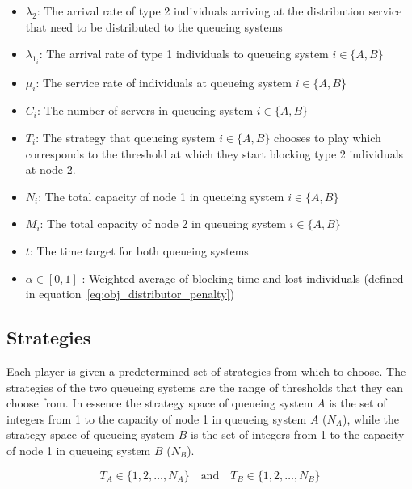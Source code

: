 \begin{itemize}
    \item \(\lambda_2\): The arrival rate of type 2 individuals arriving at the
    distribution service that need to be distributed to the queueing systems
    \item \(\lambda_{1_i}\): The arrival rate of type 1 individuals to queueing
    system \(i\in\{A, B\}\)
    \item \(\mu_i\): The service rate of individuals at queueing system
    \(i\in\{A, B\}\)
    \item \(C_i\): The number of servers in queueing system \(i\in\{A, B\}\)
    \item \(T_i\): The strategy that queueing system \(i\in\{A, B\} \) chooses
    to play which corresponds to the threshold at which they start blocking
    type 2 individuals at node 2.
    \item \(N_i\): The total capacity of node 1 in queueing system
    \(i\in\{A, B\}\)
    \item \(M_i\): The total capacity of node 2 in queueing system
    \(i\in\{A, B\}\)
    \item \(t\): The time target for both queueing systems
    \item \(\alpha \in [0, 1]\) : Weighted average of blocking time and
    lost individuals (defined in equation~\eqref{eq:obj_distributor_penalty})
\end{itemize}

\subsection{Strategies}\label{sec:game_strategies}

Each player is given a predetermined set of strategies from which to choose.
The strategies of the two queueing systems are the range of thresholds that they
can choose from.
In essence the strategy space of queueing system \(A\) is the set of integers
from
1 to the capacity of node 1 in queueing system \(A\) (\(N_A\)), while the
strategy space of queueing system \(B\) is the set of integers from 1 to the
capacity of node 1 in queueing system \(B\) (\(N_B\)).

\begin{equation}\label{eq:game_strategy_space_queueing_systems}
    T_A \in \{1, 2, \ldots, N_A\} \quad \text{and} \quad
    T_B \in \{1, 2, \ldots, N_B\}
\end{equation}

